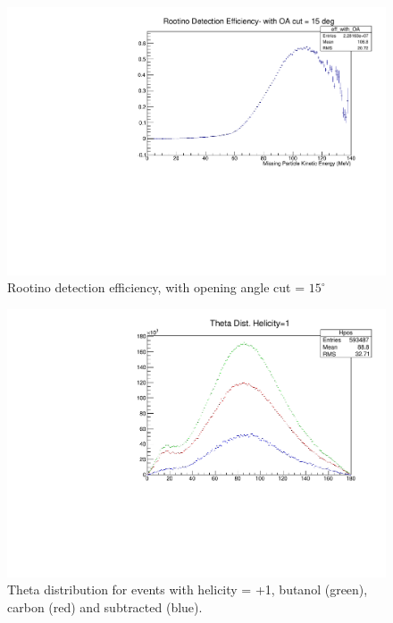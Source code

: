 \documentclass[a4paper,12pt]{article}
\begin{document}
\begin{figure}
\includegraphics[width=\textwidth]{eff_oa.pdf}
\caption{Rootino detection efficiency, with opening angle cut = $15^{\circ}$  }
\end{figure}

\begin{figure}
\includegraphics[width=\textwidth]{Asym/Theta_h1_b4.pdf}
\caption{Theta distribution for events with helicity = +1, butanol (green), carbon (red) and subtracted (blue). }
\end{figure}
\end{document}
